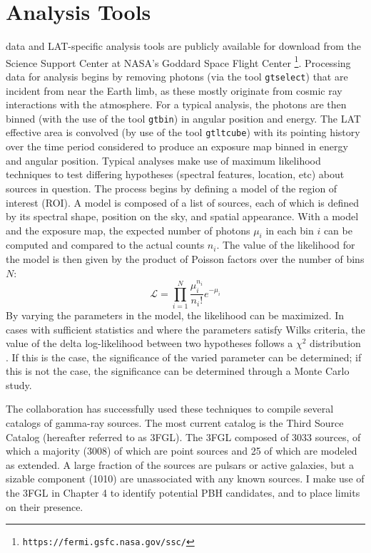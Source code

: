 \section{Analysis Tools}

\FermiLAT data and LAT-specific analysis tools are publicly available for download from the \Fermi Science Support Center at NASA's Goddard Space Flight Center \footnote{{\tt https://fermi.gsfc.nasa.gov/ssc/}}. 
Processing \FermiLAT data for analysis begins by removing photons (via the tool {\tt gtselect}) that are incident from near the Earth limb, as these mostly originate from cosmic ray interactions with the atmosphere. For a typical analysis, the photons are then binned (with the use of the tool {\tt gtbin}) in angular position and energy. The LAT effective area is convolved (by use of the tool {\tt gtltcube}) with its pointing history over the time period considered to produce an exposure map binned in energy and angular position. 
Typical \FermiLAT analyses make use of maximum likelihood techniques to test differing hypotheses (spectral features, location, etc) about sources in question. The process begins by defining a model of the region of interest (ROI). A model is composed of a list of sources, each of which is defined by its spectral shape, position on the sky, and spatial appearance. With a model and the exposure map, the expected number of photons $\mu_i$ in each bin $i$ can be computed and compared to the actual counts $n_i$. The value of the likelihood for the model is then given by the product of Poisson factors over the number of bins $N$:
\begin{equation}
\mathcal{L} = \prod_{i=1}^{N} \frac{\mu_i^{n_i}}{n_i!}e^{-\mu_i}
\end{equation}
By varying the parameters in the model, the likelihood can be maximized. In cases with sufficient statistics and where the parameters satisfy Wilks criteria, the value of the delta log-likelihood between two hypotheses follows a $\chi^2$ distribution \cite{wilks_1938}. If this is the case, the significance of the varied parameter can be determined; if this is not the case, the significance can be determined through a Monte Carlo study.

The \FermiLAT collaboration has successfully used these techniques to compile several catalogs of gamma-ray sources. The most current catalog is the Third \Fermi Source Catalog \cite{collaboration_fermi_2015} (hereafter referred to as 3FGL). The 3FGL composed of 3033 sources, of which a majority (3008) of which are point sources and 25 of which are modeled as extended. A large fraction of the sources are pulsars or active galaxies, but a sizable component (1010) are unassociated with any known sources. I make use of the 3FGL in Chapter 4 to identify potential PBH candidates, and to place limits on their presence.